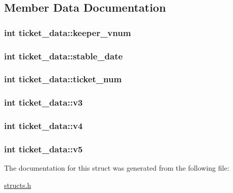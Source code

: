 \subsection{Member Data Documentation}
\hypertarget{structticket__data_a6a41b7824dc8014d01492d101a87da55}{
\subsubsection[{keeper\-\_\-vnum}]{\setlength{\rightskip}{0pt plus 5cm}int ticket\-\_\-data\-::keeper\-\_\-vnum}}\label{structticket__data_a6a41b7824dc8014d01492d101a87da55}
\hypertarget{structticket__data_ab249e3b12b7c214c269a411553be4591}{
\subsubsection[{stable\-\_\-date}]{\setlength{\rightskip}{0pt plus 5cm}int ticket\-\_\-data\-::stable\-\_\-date}}\label{structticket__data_ab249e3b12b7c214c269a411553be4591}
\hypertarget{structticket__data_a3f07c5664b95e0d5bc6f28315462b044}{
\subsubsection[{ticket\-\_\-num}]{\setlength{\rightskip}{0pt plus 5cm}int ticket\-\_\-data\-::ticket\-\_\-num}}\label{structticket__data_a3f07c5664b95e0d5bc6f28315462b044}
\hypertarget{structticket__data_a49e2dd23e6aaf1ffba0db9a4138f89a7}{
\subsubsection[{v3}]{\setlength{\rightskip}{0pt plus 5cm}int ticket\-\_\-data\-::v3}}\label{structticket__data_a49e2dd23e6aaf1ffba0db9a4138f89a7}
\hypertarget{structticket__data_aec88d5f38898662e1b7d0035ab259c8a}{
\subsubsection[{v4}]{\setlength{\rightskip}{0pt plus 5cm}int ticket\-\_\-data\-::v4}}\label{structticket__data_aec88d5f38898662e1b7d0035ab259c8a}
\hypertarget{structticket__data_a436bfddcf5066e7f186a9281ae7e818e}{
\subsubsection[{v5}]{\setlength{\rightskip}{0pt plus 5cm}int ticket\-\_\-data\-::v5}}\label{structticket__data_a436bfddcf5066e7f186a9281ae7e818e}


The documentation for this struct was generated from the following file\-:\begin{DoxyCompactItemize}
\item 
\hyperlink{structs_8h}{structs.\-h}\end{DoxyCompactItemize}
